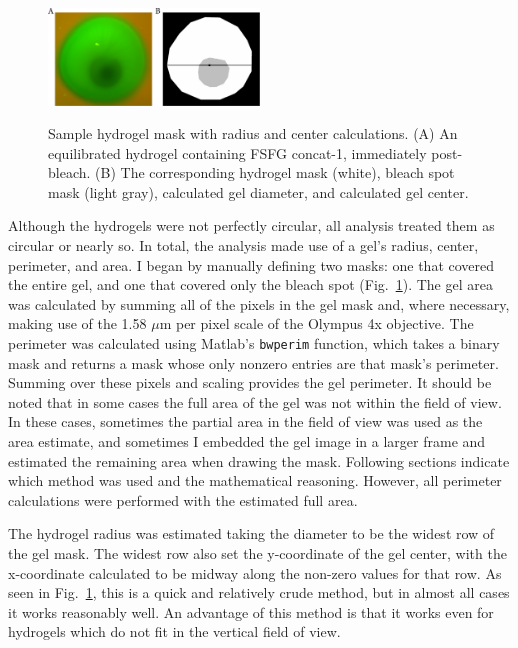 \begin{figure} 
\caption{Sample hydrogel mask with radius and center calculations.  (A) An equilibrated hydrogel containing FSFG concat-1, immediately post-bleach. (B) The corresponding hydrogel mask (white), bleach spot mask (light gray), calculated gel diameter, and calculated gel center.}
\centering
\includegraphics[width=0.5\textwidth]{figs/ch04/geometry.pdf}
\label{fig:masks}
\end{figure} 

Although the hydrogels were not perfectly circular, all analysis treated them as circular or nearly so.  In total, the analysis made use of a gel's radius, center, perimeter, and area.  I began by manually defining two masks: one that covered the entire gel, and one that covered only the bleach spot (Fig.~\ref{fig:masks}).  The gel area was calculated by summing all of the pixels in the gel mask and, where necessary, making use of the 1.58 $\mu$m per pixel scale of the Olympus 4x objective.  The perimeter was calculated using Matlab's \texttt{bwperim} function, which takes a binary mask and returns a mask whose only nonzero entries are that mask's perimeter.  Summing over these pixels and scaling provides the gel perimeter.  It should be noted that in some cases the full area of the gel was not within the field of view.  In these cases, sometimes the partial area in the field of view was used as the area estimate, and sometimes I embedded the gel image in a larger frame and estimated the remaining area when drawing the mask.  Following sections indicate which method was used and the mathematical reasoning.  However, all perimeter calculations were performed with the estimated full area.

The hydrogel radius was estimated taking the diameter to be the widest row of the gel mask.  The widest row also set the y-coordinate of the gel center, with the x-coordinate calculated to be midway along the non-zero values for that row.  As seen in Fig.~\ref{fig:masks}, this is a quick and relatively crude method, but in almost all cases it works reasonably well.  An advantage of this method is that it works even for hydrogels which do not fit in the vertical field of view.

